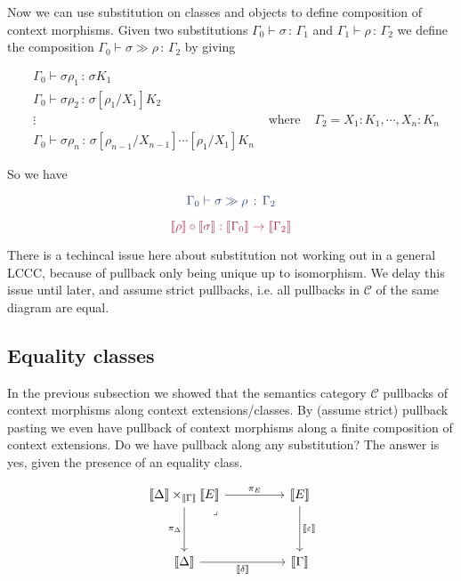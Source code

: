 \documentclass{article}
\newcommand{\bbrkt}[1]{\llbracket #1 \rrbracket}
\newcommand{\Subst}[3]{[#1 / #2] #3}
\newcommand{\CtxExt}[3]{#1,#2 : #3}
\newcommand{\ObjJdg}[3]{#1 \vdash #2 \, : \, #3 }
\newcommand{\<}{\langle}
\renewcommand{\>}{\rangle}
\newcommand{\de}{\delta}
\newcommand{\ep}{\varepsilon}
\newcommand{\si}{\sigma}
\newcommand{\Ga}{\Gamma}
\newcommand{\De}{\Delta}
\newcommand{\CC}{\mathcal{C}}
\theoremstyle{definitionstyle}
\theoremstyle{exercisestyle}
\theoremstyle{remarkstyle}
\begin{document}
Now we can use substitution on classes and objects to define composition of context morphisms.
Given two substitutions $\ObjJdg{\Ga_{0}}{\si}{\Ga_{1}}$ and $\ObjJdg{\Ga_{1}}{\rho}{\Ga_{2}}$
we define the composition $\ObjJdg{\Ga_{0}}{\si \gg \rho}{\Ga_{2}}$
by giving

\begin{align*}
  &\ObjJdg{\Ga_{0}}{\si{\rho_{1}}}{\si K_{1}}\\
  &\ObjJdg{\Ga_{0}}{\si\rho_{2}}{\si \Subst{\rho_{1}}{X_{1}}{K_{2}}} \\
  &\vdots & \text{ where } & \Ga_{2} = \CtxExt{X_{1}:K_{1}}{\cdots, X_{n}}{K_{n}}\\
  &\ObjJdg{\Ga_{0}}{\si \rho_{n}}{\si \Subst{\rho_{n-1}}{X_{n-1}}{\cdots \Subst{\rho_{1}}{X_{1}}{K_{n}}}}
\end{align*}

So we have

\begin{multicols}{2}
  \[\color{syntax} \ObjJdg{\Ga_{0}}{\si \gg \rho}{\Ga_{2}}\]

   \[ \color{semantics}
    \bbrkt{\rho} \circ \bbrkt{\si} : \bbrkt{\Ga_0} \to \bbrkt{\Ga_2} \]
\end{multicols}

There is a techincal issue here about substitution not working out in a general LCCC,
because of pullback only being unique up to isomorphism.
We delay this issue until later,
and assume strict pullbacks,
i.e. all pullbacks in $\CC$ of the same diagram are equal. %

\subsection{Equality classes}
In the previous subsection we showed that the semantics category $\CC$
pullbacks of context morphisms along context extensions/classes.
By (assume strict) pullback pasting \cite{pullback_pasting} we even have pullback of context morphisms along
a finite composition of context extensions.
Do we have pullback along any substitution?
The answer is yes, given the presence of an equality class.

\[\begin{tikzcd}
  {\bbrkt{\De} \times_{\bbrkt{\Ga}} \bbrkt{E}} && \bbrkt{E} \\
  \\
  \bbrkt{\De} && \bbrkt{\Ga}
  \arrow["\pi_{E}", from=1-1, to=1-3]
  \arrow["\bbrkt{\de}"', from=3-1, to=3-3]
  \arrow["\bbrkt{\ep}", from=1-3, to=3-3]
  \arrow["\pi_{\De}"', from=1-1, to=3-1]
  \arrow["\lrcorner"{anchor=center, pos=0.125}, draw=none, from=1-1, to=3-3]
\end{tikzcd}\]
\end{document}
